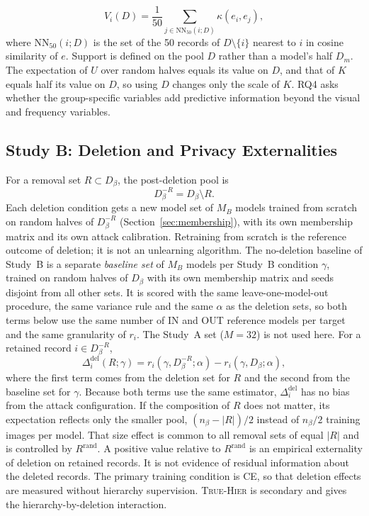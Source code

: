 \documentclass{article} %
\newcommand{\cn}[1]{\textsc{#1}}
\begin{document}
\begin{equation}
V_i(D)=\frac{1}{50}\sum_{j\in\mathrm{NN}_{50}(i;D)}\kappa(e_i,e_j),
\label{eq:vdens}
\end{equation}
where $\mathrm{NN}_{50}(i;D)$ is the set of the 50 records of $D\setminus\{i\}$ nearest to $i$ in cosine similarity of $e$. Support is defined on the pool $D$ rather than a model's half $D_m$. The expectation of $U$ over random halves equals its value on $D$, and that of $K$ equals half its value on $D$, so using $D$ changes only the scale of $K$. RQ4 asks whether the group-specific variables add predictive information beyond the visual and frequency variables.

\subsection{Study B: Deletion and Privacy Externalities}
\label{sec:deletion}

For a removal set $R\subset D_\beta$, the post-deletion pool is
\begin{equation}
D_\beta^{-R}=D_\beta\setminus R.
\label{eq:delete}
\end{equation}
Each deletion condition gets a new model set of $M_B$ models trained from scratch on random halves of $D_\beta^{-R}$ (Section~\ref{sec:membership}), with its own membership matrix and its own attack calibration. Retraining from scratch is the reference outcome of deletion; it is not an unlearning algorithm. The no-deletion baseline of Study~B is a separate \emph{baseline set} of $M_B$ models per Study~B condition $\gamma$, trained on random halves of $D_\beta$ with its own membership matrix and seeds disjoint from all other sets. It is scored with the same leave-one-model-out procedure, the same variance rule and the same $\alpha$ as the deletion sets, so both terms below use the same number of IN and OUT reference models per target and the same granularity of $r_i$. The Study~A set ($M=32$) is not used here. For a retained record $i\in D_\beta^{-R}$,
\begin{equation}
\Delta_i^{\mathrm{del}}(R;\gamma)=r_i(\gamma,D_\beta^{-R};\alpha)-r_i(\gamma,D_\beta;\alpha),
\label{eq:ddel}
\end{equation}
where the first term comes from the deletion set for $R$ and the second from the baseline set for $\gamma$. Because both terms use the same estimator, $\Delta_i^{\mathrm{del}}$ has no bias from the attack configuration. If the composition of $R$ does not matter, its expectation reflects only the smaller pool, $(n_\beta-|R|)/2$ instead of $n_\beta/2$ training images per model. That size effect is common to all removal sets of equal $|R|$ and is controlled by $R^{\mathrm{rand}}$. A positive value relative to $R^{\mathrm{rand}}$ is an empirical externality of deletion on retained records. It is not evidence of residual information about the deleted records. The primary training condition is \cn{CE}, so that deletion effects are measured without hierarchy supervision. \cn{True-Hier} is secondary and gives the hierarchy-by-deletion interaction.
\end{document}
